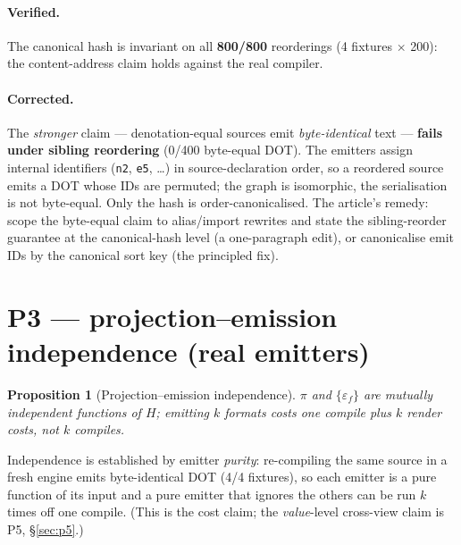 \documentclass[11pt]{article}
\newtheorem{proposition}{Proposition}
\theoremstyle{definition}
\begin{document}
\paragraph{Verified.} The canonical hash is invariant on all \textbf{800/800} reorderings (4 fixtures $\times$
200): the content-address claim holds against the real compiler.

\paragraph{Corrected.} The \emph{stronger} claim --- denotation-equal sources emit \emph{byte-identical} text ---
\textbf{fails under sibling reordering} (0/400 byte-equal DOT). The emitters assign internal identifiers
(\texttt{n2}, \texttt{e5}, \dots) in source-declaration order, so a reordered source emits a DOT whose IDs are
permuted; the graph is isomorphic, the serialisation is not byte-equal. Only the hash is order-canonicalised. The
article's remedy: scope the byte-equal claim to alias/import rewrites and state the sibling-reorder guarantee at
the canonical-hash level (a one-paragraph edit), or canonicalise emit IDs by the canonical sort key (the
principled fix).



\section{P3 --- projection--emission independence (real emitters)}
\label{sec:p3}

\begin{proposition}[Projection--emission independence]
$\pi$ and $\{\varepsilon_f\}$ are mutually independent functions of $H$; emitting $k$ formats costs one compile
plus $k$ render costs, not $k$ compiles.
\end{proposition}

Independence is established by emitter \emph{purity}: re-compiling the same source in a fresh engine emits
byte-identical DOT (4/4 fixtures), so each emitter is a pure function of its input and a pure emitter that ignores
the others can be run $k$ times off one compile. (This is the cost claim; the \emph{value}-level cross-view claim
is P5, \S\ref{sec:p5}.)


\end{document}
